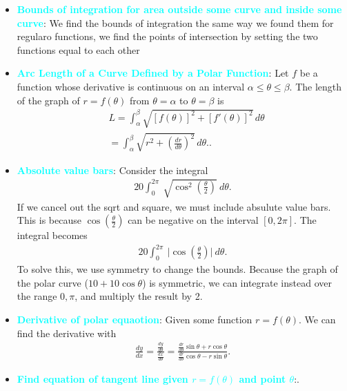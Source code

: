 \documentclass{report}
\begin{document}
\begin{itemize}
        \item \textbf{\textcolor{cyan}{Bounds of integration for area outside some curve and inside some curve}}: We find the bounds of integration the same way we found them for regularo functions, we find the points of intersection by setting the two functions equal to each other
        \item \textbf{\textcolor{cyan}{Arc Length of a Curve Defined by a Polar Function}}:
            Let \( f \) be a function whose derivative is continuous on an interval \( \alpha \leq \theta \leq \beta \). The length of the graph of \( r = f(\theta) \) from \( \theta = \alpha \) to \( \theta = \beta \) is
            \begin{align*}
              &L = \int_{\alpha}^{\beta} \sqrt{[f(\theta)]^2 + [f'(\theta)]^2} \, d\theta \\
              &= \int_{\alpha}^{\beta} \sqrt{r^2 + \left(\frac{dr}{d\theta}\right)^2} \, d\theta. 
          .\end{align*}
        \item \textbf{\textcolor{cyan}{Absolute value bars}}: Consider the integral
            \begin{align*}
                20 \int_{0}^{2\pi}\ \sqrt{\cos^{2}{\left(\frac{\theta }{2}\right)}}\ d\theta 
            .\end{align*}
            If we cancel out the sqrt and square, we must include absulute value bars. This is because $\cos{\left(\frac{\theta }{2}\right)}$ can be negative on the interval $[0,2\pi]$. The integral becomes
            \begin{align*}
                20 \int_{0}^{2\pi}\ \bigg\lvert \cos{\left(\frac{\theta}{2}\right)} \bigg\rvert\ d\theta 
            .\end{align*}
            To solve this, we use symmetry to change the bounds. Because the graph of the polar curve ($10+10\cos{\theta}$) is symmetric, we can integrate instead over the range $0,\pi$, and multiply the result by 2.
        \item \textbf{\textcolor{cyan}{Derivative of polar equaotion}}: Given some function $r=f(\theta )$. We can find the derivative with
            \begin{align*}
                \frac{dy}{dx} = \frac{\frac{dy}{d\theta}}{\frac{dx}{d\theta}} = \frac{\frac{dr}{d\theta }\sin{\theta } + r\cos{\theta }}{\frac{dr}{d\theta }\cos{\theta } - r\sin{\theta}}
            .\end{align*}
        \item \textbf{\textcolor{cyan}{Find equation of tangent line given $r = f(\theta )$ and point $\theta$}}:. 

\end{itemize}
\end{document}
